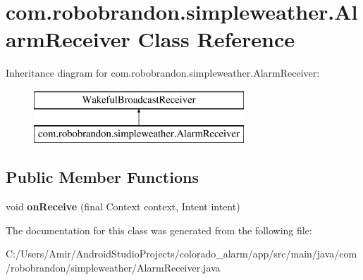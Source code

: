 \hypertarget{classcom_1_1robobrandon_1_1simpleweather_1_1_alarm_receiver}{}\section{com.\+robobrandon.\+simpleweather.\+Alarm\+Receiver Class Reference}
\label{classcom_1_1robobrandon_1_1simpleweather_1_1_alarm_receiver}
Inheritance diagram for com.\+robobrandon.\+simpleweather.\+Alarm\+Receiver\+:\begin{figure}[H]
\begin{center}
\leavevmode
\includegraphics[height=2.000000cm]{classcom_1_1robobrandon_1_1simpleweather_1_1_alarm_receiver}
\end{center}
\end{figure}
\subsection*{Public Member Functions}
\begin{DoxyCompactItemize}
\item 
void {\bfseries on\+Receive} (final Context context, Intent intent)\hypertarget{classcom_1_1robobrandon_1_1simpleweather_1_1_alarm_receiver_a8fa7ba715ef9f140ab59df03bc9d66ae}{}\label{classcom_1_1robobrandon_1_1simpleweather_1_1_alarm_receiver_a8fa7ba715ef9f140ab59df03bc9d66ae}

\end{DoxyCompactItemize}


The documentation for this class was generated from the following file\+:\begin{DoxyCompactItemize}
\item 
C\+:/\+Users/\+Amir/\+Android\+Studio\+Projects/colorado\+\_\+alarm/app/src/main/java/com/robobrandon/simpleweather/Alarm\+Receiver.\+java\end{DoxyCompactItemize}
